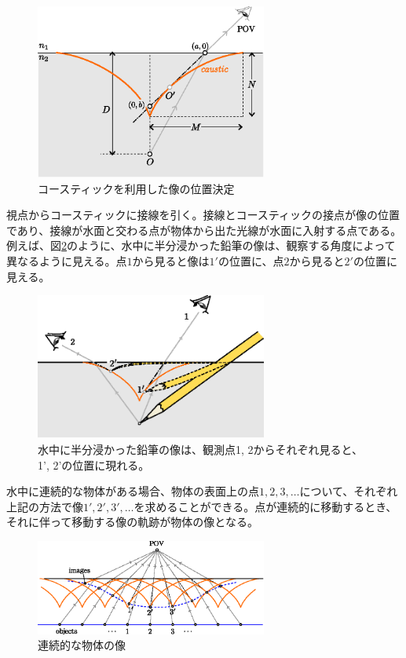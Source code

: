 \documentclass[twocolumn]{article}
\begin{document}
	\begin{figure}[ht]
		\centering
		\includegraphics[width=3in]{figs/g394.eps}
		\caption{コースティックを利用した像の位置決定}
		\label{fig:image_caustic}
	\end{figure}
	
	視点からコースティックに接線を引く。接線とコースティックの接点が像の位置であり、接線が水面と交わる点が物体から出た光線が水面に入射する点である。
	例えば、図\ref{fig:pencil_view}のように、水中に半分浸かった鉛筆の像は、観察する角度によって異なるように見える。点$1$から見ると像は$1'$の位置に、点$2$から見ると$2'$の位置に見える。
	
	\begin{figure}[ht]
		\centering
		\includegraphics[width=3in]{figs/g43.eps}
		\caption{水中に半分浸かった鉛筆の像は、観測点1, 2からそれぞれ見ると、1', 2'の位置に現れる。}
		\label{fig:pencil_view}
	\end{figure}
	
	水中に連続的な物体がある場合、物体の表面上の点$1, 2, 3, \dots$について、それぞれ上記の方法で像$1', 2', 3', \dots$を求めることができる。点が連続的に移動するとき、それに伴って移動する像の軌跡が物体の像となる。
	
	\begin{figure}[ht]
		\centering
		\includegraphics*[width=3in]{figs/g240.eps}
		\caption{連続的な物体の像}
		\label{fig:extended_image}
	\end{figure}
	
\end{document}
